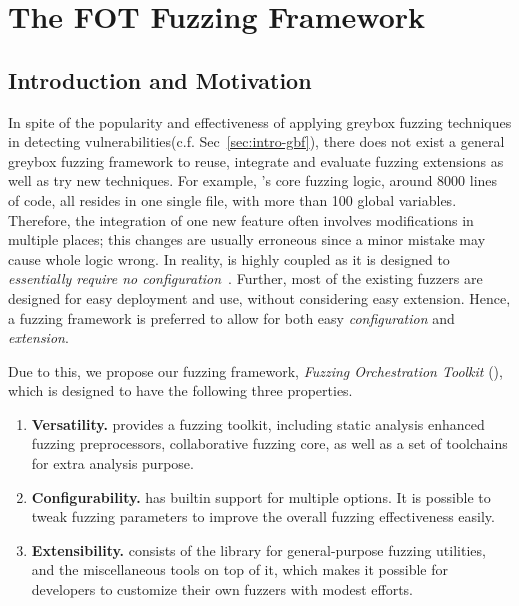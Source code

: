 
\chapter{The FOT Fuzzing Framework} \label{ch:fot}


\section{Introduction and Motivation}


In spite of the popularity and effectiveness of applying greybox fuzzing techniques in detecting vulnerabilities(c.f. Sec~\ref{sec:intro-gbf}), there does not exist a general greybox fuzzing framework to reuse, integrate and evaluate fuzzing extensions as well as try new techniques.
For example, {\AFL}'s core fuzzing logic, around 8000 lines of code, all resides in one single file, with more than 100 global variables. Therefore, the integration of one new feature often involves modifications in multiple places; this changes are usually erroneous since a minor mistake may cause whole logic wrong.
In reality, {\AFL} is highly coupled as it is designed to \textit{essentially require no configuration}~\cite{afl}.
Further, most of the existing fuzzers are designed for easy deployment and use, without considering easy extension.
Hence, a fuzzing framework is preferred to allow for both easy \emph{configuration} and \emph{extension}.


Due to this, we propose our fuzzing framework, \emph{Fuzzing Orchestration Toolkit} ({\FOT}), which is designed to have the following three properties.

\begin{enumerate}[(1)]

\item  \textbf{Versatility.}
{\FOT} provides a fuzzing toolkit, including static analysis enhanced fuzzing preprocessors, collaborative fuzzing core, as well as a set of toolchains for extra analysis purpose.
\item \textbf{Configurability.}
{\FOT} has builtin support for multiple options.	
It is possible to tweak fuzzing parameters to improve the overall fuzzing effectiveness easily.
\item \textbf{Extensibility.}
{\FOT} consists of the library for general-purpose fuzzing utilities, and the miscellaneous tools on top of it, which makes it possible for developers to customize their own fuzzers with modest efforts.
\end{enumerate}


